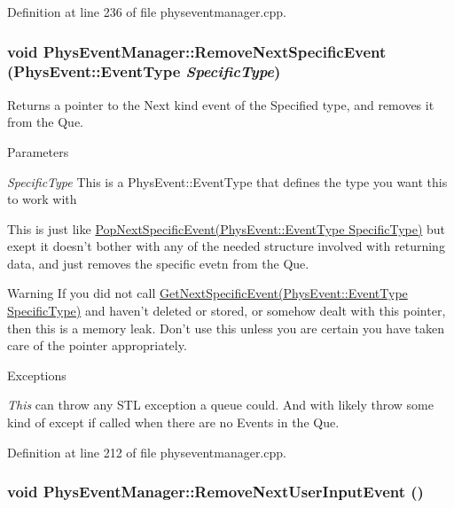 Definition at line 236 of file physeventmanager.cpp.\hypertarget{classPhysEventManager_a2d0c21e369d16cd2de97eb4c69003323}{
\subsubsection[{RemoveNextSpecificEvent}]{\setlength{\rightskip}{0pt plus 5cm}void PhysEventManager::RemoveNextSpecificEvent (PhysEvent::EventType {\em SpecificType})}}
\label{d5/dd7/classPhysEventManager_a2d0c21e369d16cd2de97eb4c69003323}


Returns a pointer to the Next kind event of the Specified type, and removes it from the Que. 
\begin{DoxyParams}{Parameters}
\item[{\em SpecificType}]This is a PhysEvent::EventType that defines the type you want this to work with\end{DoxyParams}
This is just like \hyperlink{classPhysEventManager_abce156f7ad7ab145b8b05740b48e6073}{PopNextSpecificEvent(PhysEvent::EventType SpecificType)} but exept it doesn't bother with any of the needed structure involved with returning data, and just removes the specific evetn from the Que. \begin{DoxyWarning}{Warning}
If you did not call \hyperlink{classPhysEventManager_a56e45572c2fb84131f7d55c060c7ac21}{GetNextSpecificEvent(PhysEvent::EventType SpecificType)} and haven't deleted or stored, or somehow dealt with this pointer, then this is a memory leak. Don't use this unless you are certain you have taken care of the pointer appropriately. 
\end{DoxyWarning}

\begin{DoxyExceptions}{Exceptions}
\item[{\em This}]can throw any STL exception a queue could. And with likely throw some kind of except if called when there are no Events in the Que. \end{DoxyExceptions}


Definition at line 212 of file physeventmanager.cpp.\hypertarget{classPhysEventManager_a9c6f5296c9961fa469ebe06d7599283a}{
\subsubsection[{RemoveNextUserInputEvent}]{\setlength{\rightskip}{0pt plus 5cm}void PhysEventManager::RemoveNextUserInputEvent ()}}
\label{d5/dd7/classPhysEventManager_a9c6f5296c9961fa469ebe06d7599283a}


